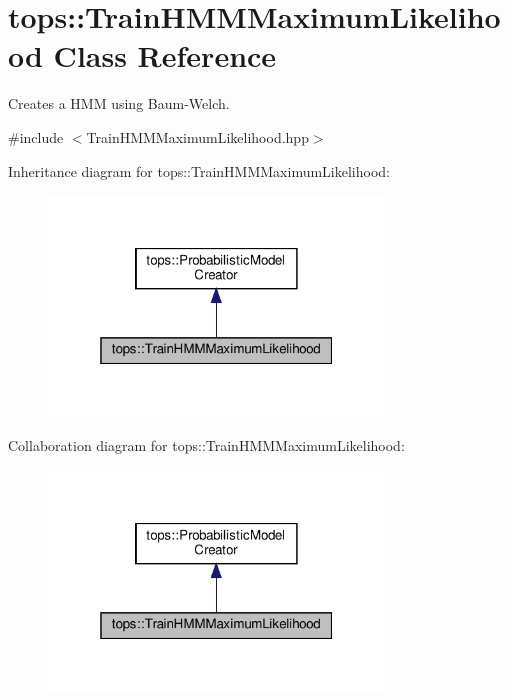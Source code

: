 \hypertarget{classtops_1_1TrainHMMMaximumLikelihood}{}\section{tops\+:\+:Train\+H\+M\+M\+Maximum\+Likelihood Class Reference}
\label{classtops_1_1TrainHMMMaximumLikelihood}


Creates a H\+MM using Baum-\/\+Welch.  




{\ttfamily \#include $<$Train\+H\+M\+M\+Maximum\+Likelihood.\+hpp$>$}



Inheritance diagram for tops\+:\+:Train\+H\+M\+M\+Maximum\+Likelihood\+:
\nopagebreak
\begin{figure}[H]
\begin{center}
\leavevmode
\includegraphics[width=253pt]{classtops_1_1TrainHMMMaximumLikelihood__inherit__graph}
\end{center}
\end{figure}


Collaboration diagram for tops\+:\+:Train\+H\+M\+M\+Maximum\+Likelihood\+:
\nopagebreak
\begin{figure}[H]
\begin{center}
\leavevmode
\includegraphics[width=253pt]{classtops_1_1TrainHMMMaximumLikelihood__coll__graph}
\end{center}
\end{figure}
